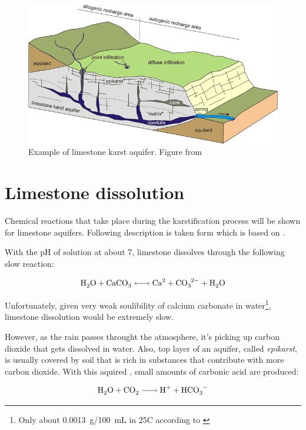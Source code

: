 \begin{figure}
  \centerline{\includegraphics[width=\textwidth]{chapters/karstification/karstification.png}}
  \caption{Example of limestone karst aquifer.
    Figure from \cite{golscheider2007methods}}
  \label{fig:karstification}
\end{figure}

\section{Limestone dissolution}

Chemical reactions that take place during the karstification process will be
shown for limestone aquifers. Following description is taken form \cite{dreybrodt2002}
which is based on \cite{plummer1978}.

With the pH of solution at about 7, limestone dissolves through the following
slow reaction:

\begin{equation}
  \cee{H2O + CaCO3 <-> Ca^2 + CO3^2- + H2O}
  \label{eq1}
\end{equation}

Unfortunately, given very weak soulibility of calcium carbonate in water\footnote{Only about 0.0013~g/100~mL in 25\degree C according to \cite{aylward2008si}},
limestone dissolution would be extremely slow.

However, as the rain passes throught the atmosphere, it's picking up carbon
dioxide that gets dissolved in water. Also, top layer of an aquifer, called
\emph{epikarst}, is usually covered by soil that is rich in substances that
contribute with more carbon dioxide. With this aquired , small amounts
of carbonic acid are produced:

\begin{equation}
  \cee{H2O + CO2 -> H^+ + HCO3^-}
  \label{eq2}
\end{equation}

